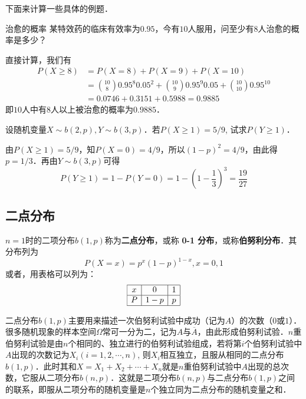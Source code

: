 下面来计算一些具体的例题．
\begin{example}{治愈的概率}
某特效药的临床有效率为$0. 95$，今有$10 $人服用，问至少有$8 $人治愈的概率是多少？

直接计算，我们有
\begin{equation}
\begin{aligned} P(X \geqslant 8) &=P(X=8)+P(X=9)+P(X=10) \\ &=\binom{10}{8} 0.95^{8} 0.05^{2}+\binom{10}{9} 0.95^{9} 0.05+\binom{10}{10} 0.95^{10} \\ &=0.0746+0.3151+0.5988=0.9885 \end{aligned}
\end{equation}
即$10 $人中有$8 $人以上被治愈的概率为$0. 988 5$．
\end{example}

\begin{example}{}
设随机变量$X\sim b(2,p),Y\sim b(3,p)$．若$P (X\geqslant1) = 5/9$, 试求$P(Y\geqslant1)$．

由$P(X\geqslant1)=5/9$，知$P(X=0)=4/9$，所以$(1-p)^2=4/9$，由此得$p=1/3$．再由$Y\sim b(3,p)$可得
\begin{equation}
P(Y \geqslant 1)=1-P(Y=0)=1-\left(1-\frac{1}{3}\right)^{3}=\frac{19}{27}
\end{equation}
\end{example}

\subsection{二点分布}
$n=1$时的二项分布$b (1 ,p)$称为\textbf{二点分布}，或称 \textbf{0-1 分布}，或称\textbf{伯努利分布}．其分布列为
\begin{equation}
P(X=x)=p^{x}(1-p)^{1-x}, x=0,1
\end{equation}
或者，用表格可以列为：
\begin{equation}
\begin{array}{|c|c|c|}\hline x & 0 & 1 \\ \hline P & 1-p & p \\ \hline  \end{array}
\end{equation}

二点分布$b(1 ,p) $主要用来描述一次伯努利试验中成功（记为$A$）的次数（$0$或$1$）．很多随机现象的样本空间$\Omega$常可一分为二，记为$A $与$\overline A$，由此形成伯努利试验．$n $重伯努利试验是由$n $个相同的、独立进行的伯努利试验组成，若将第$i $个伯努利试验中$A $出现的次数记为$X_i (i= 1,2, \cdots, n)$, 则$X_i$相互独立，且服从相同的二点分布$b(1 ,p)$．此时其和$X=X_1+X_2+\cdots+X_n$就是$n $重伯努利试验中$A $出现的总次数，它服从二项分布$b(n,p)$．这就是二项分布$b (n ,p) $与二点分布$b(1,p)$之间的联系，即服从二项分布的随机变量是$n$个独立同为二点分布的随机变量之和．

